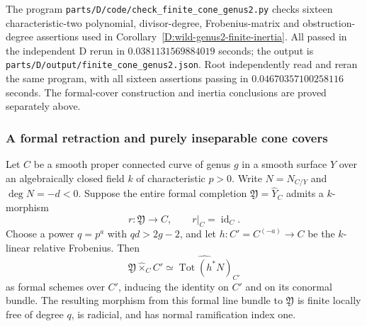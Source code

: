 \begin{remark}
The program \nolinkurl{parts/D/code/check_finite_cone_genus2.py}
checks sixteen characteristic-two polynomial, divisor-degree,
Frobenius-matrix and obstruction-degree assertions used in
Corollary~\ref{D:wild-genus2-finite-inertia}.
All passed in the independent D rerun in
$0.0381131569884019$ seconds; the output is
\nolinkurl{parts/D/output/finite_cone_genus2.json}.
Root independently read and reran the same program, with all
sixteen assertions passing in $0.04670357100258116$ seconds.
The formal-cover construction and inertia conclusions are
proved separately above.
\end{remark}

\subsubsection{A formal retraction and purely inseparable cone covers}

\begin{lemma}
\label{D:formal-retraction-cone-cover}
Let $C$ be a smooth proper connected curve of genus $g$ in a
smooth surface $Y$ over an algebraically closed field $k$ of
characteristic $p>0$.  Write $N=N_{C/Y}$ and $\deg N=-d<0$.
Suppose the entire formal completion $\mathfrak Y=\widehat Y_C$
admits a $k$-morphism
\[
                  r:\mathfrak Y\longrightarrow C,
                  \qquad r|_C=\operatorname{id}_C.
\]
Choose a power $q=p^a$ with $qd>2g-2$, and let
$h:C'=C^{(-a)}\to C$ be the $k$-linear relative Frobenius.
Then
\[
 \mathfrak Y\mathbin{\widehat\times}_C C'
       \simeq\widehat{\operatorname{Tot}(h^*N)}_{C'}
\]
as formal schemes over $C'$, inducing the identity on $C'$
and on its conormal bundle.  The resulting morphism from
this formal line bundle to $\mathfrak Y$ is finite locally
free of degree $q$, is radicial, and has normal ramification
index one.
\end{lemma}

